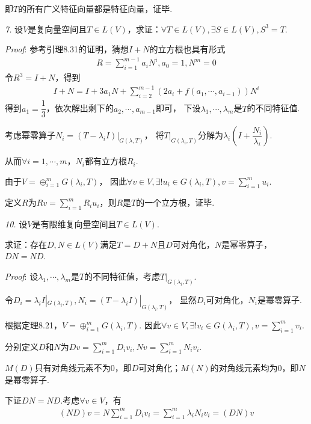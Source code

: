 即\(T\)的所有广义特征向量都是特征向量，证毕.

\hspace*{\fill}

\textit{7.}
设\(V\)是复向量空间且\(T \in L(V)\)，求证：\(\forall T \in L(V),\exists S \in L(V),S^3=T\).

\textit{Proof}:
参考引理8.31的证明，猜想\(I+N\)的立方根也具有形式
    \begin{align*}
        R=\sum_{i=1}^{m-1} a_iN^i,a_0=1,N^m=0
    \end{align*}
令\(R^3=I+N\)，得到
    \begin{align*}
        I+N=I+3a_1N+\sum_{i=2}^{m-1} (2a_i+f(a_1,\cdots,a_{i-1}))N^i
    \end{align*}
得到\(a_1=\dfrac{1}{3}\)，依次解出剩下的\(a_2,\cdots,a_{m-1}\)即可，
下设\(\lambda_1,\cdots,\lambda_m\)是\(T\)的不同特征值.

考虑幂零算子\(N_i=(T-\lambda_i I)|_{G(\lambda,T)}\)，
将\(T|_{G(\lambda_i,T)}\)分解为\(\lambda_i(I+\dfrac{N_i}{\lambda_i})\).

从而\(\forall i=1,\cdots,m\)，\(N_i\)都有立方根\(R_i\).

由于\(V=\oplus_{i=1}^m G(\lambda_i,T)\)，
因此\(\forall v \in V,\exists! u_i \in G(\lambda_i,T),v=\sum_{i=1}^m u_i\).

定义\(R\)为\(Rv=\sum_{i=1}^m R_iu_i\)，则\(R\)是\(T\)的一个立方根，证毕.

\newpage

\textit{10.}
设\(V\)是有限维复向量空间且\(T \in L(V)\).

求证：存在\(D,N \in L(V)\)满足\(T=D+N\)且\(D\)可对角化，\(N\)是幂零算子，\(DN=ND\).

\textit{Proof}:
设\(\lambda_1,\cdots,\lambda_m\)是\(T\)的不同特征值，考虑\(T|_{G(\lambda_i,T)}\).

令\(D_i=\lambda_i I|_{G(\lambda_i,T)},N_i=(T-\lambda_i I)|_{G(\lambda_i,T)}\)，
显然\(D_i\)可对角化，\(N_i\)是幂零算子.

根据定理8.21，\(V=\oplus_{i=1}^m G(\lambda_i,T)\).
因此\(\forall v \in V,\exists! v_i \in G(\lambda_i,T),v=\sum_{i=1}^m v_i\).

分别定义\(D\)和\(N\)为\(Dv=\sum_{i=1}^m D_iv_i,Nv=\sum_{i=1}^m N_iv_i\).

\(M(D)\)只有对角线元素不为\(0\)，即\(D\)可对角化；\(M(N)\)的对角线元素均为\(0\)，即\(N\)是幂零算子.

下证\(DN=ND\).考虑\(\forall v \in V\)，有
    \begin{align*}
        (ND)v=N\sum_{i=1}^m D_iv_i=\sum_{i=1}^m \lambda_iN_iv_i=(DN)v
    \end{align*}

